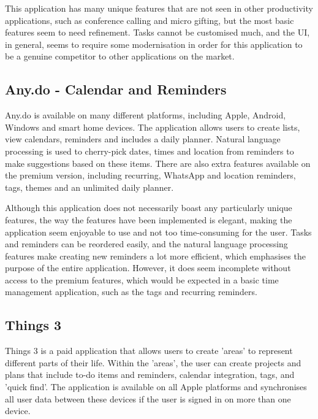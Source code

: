 	        
	        
	        This application has many unique features that are not seen in other productivity applications, such as conference calling and micro gifting, but the most basic features seem to need refinement.  Tasks cannot be customised much, and the UI, in general, seems to require some modernisation in order for this application to be a genuine competitor to other applications on the market.

	        \subsection{Any.do - Calendar and Reminders}
	        
	        Any.do\cite{any.do} is available on many different platforms, including Apple, Android, Windows and smart home devices.  The application allows users to create lists, view calendars, reminders and includes a daily planner.  Natural language processing is used to cherry-pick dates, times and location from reminders to make suggestions based on these items.  There are also extra features available on the premium version, including recurring, WhatsApp and location reminders, tags, themes and an unlimited daily planner.
	        
	        
	        
	        Although this application does not necessarily boast any particularly unique features, the way the features have been implemented is elegant, making the application seem enjoyable to use and not too time-consuming for the user.  Tasks and reminders can be reordered easily, and the natural language processing features make creating new reminders a lot more efficient, which emphasises the purpose of the entire application.  However, it does seem incomplete without access to the premium features, which would be expected in a basic time management application, such as the tags and recurring reminders.
	        
	        \subsection{Things 3}
	        
	        Things 3\cite{things_3} is a paid application that allows users to create 'areas' to represent different parts of their life.  Within the 'areas', the user can create projects and plans that include to-do items and reminders, calendar integration, tags, and 'quick find'.  The application is available on all Apple platforms and synchronises all user data between these devices if the user is signed in on more than one device.
	        
